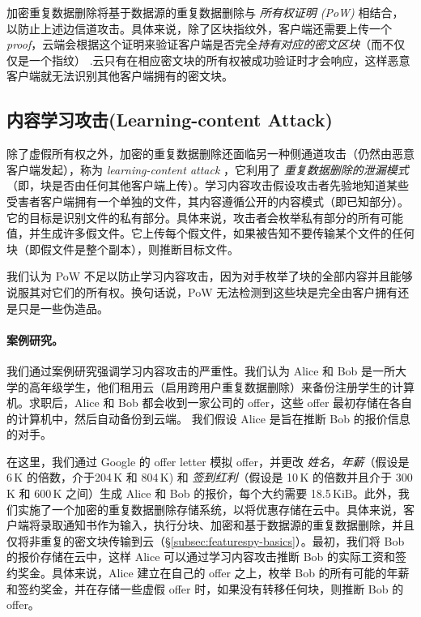 加密重复数据删除将基于数据源的重复数据删除与 {\em 所有权证明 (PoW)} \cite{halevi11} 相结合，以防止上述边信道攻击。具体来说，除了区块指纹外，客户端还需要上传一个{\em proof}，云端会根据这个证明来验证客户端是否完全{\em 持有对应的密文区块}（而不仅仅是一个指纹） .云只有在相应密文块的所有权被成功验证时才会响应，这样恶意客户端就无法识别其他客户端拥有的密文块。

\subsection{内容学习攻击(Learning-content Attack)}
\label{subsec:featurespy-attack}
除了虚假所有权之外，加密的重复数据删除还面临另一种侧通道攻击（仍然由恶意客户端发起），称为 {\em learning-content attack} \cite{harnik10, zuo18}，它利用了 {\em 重复数据删除的泄漏模式}（即，块是否由任何其他客户端上传）。学习内容攻击假设攻击者先验地知道某些受害者客户端拥有一个单独的文件，其内容遵循公开的内容模式（即已知部分）。它的目标是识别文件的私有部分。具体来说，攻击者会枚举私有部分的所有可能值，并生成许多假文件。它上传每个假文件，如果被告知不要传输某个文件的任何块（即假文件是整个副本），则推断目标文件。

我们认为 PoW \cite{halevi11} 不足以防止学习内容攻击，因为对手枚举了块的全部内容并且能够说服其对它们的所有权。换句话说，PoW 无法检测到这些块是完全由客户拥有还是只是一些伪造品。

\paragraph*{案例研究。}
我们通过案例研究强调学习内容攻击的严重性。我们认为 Alice 和 Bob 是一所大学的高年级学生，他们租用云（启用跨用户重复数据删除）来备份注册学生的计算机。求职后，Alice 和 Bob 都会收到一家公司的 offer，这些 offer 最初存储在各自的计算机中，然后自动备份到云端。
我们假设 Alice 是旨在推断 Bob 的报价信息的对手。


在这里，我们通过 Google 的 offer letter \cite{google_offer} 模拟 offer，并更改 \textit{姓名}，\textit{年薪}（假设是 6\,K \cite{harnik10} 的倍数，介于204\,K 和 804\,K) 和 \textit{签到红利}（假设是 10\,K 的倍数并且介于 300\,K 和 600\,K 之间）生成 Alice 和 Bob 的报价，每个大约需要 18.5\,KiB。此外，我们实施了一个加密的重复数据删除存储系统，以将优惠存储在云中。具体来说，客户端将录取通知书作为输入，执行分块、加密和基于数据源的重复数据删除，并且仅将非重复的密文块传输到云（\S\ref{subsec:featurespy-basics}）。最初，我们将 Bob 的报价存储在云中，这样 Alice 可以通过学习内容攻击推断 Bob 的实际工资和签约奖金。具体来说，Alice 建立在自己的 offer 之上，枚举 Bob 的所有可能的年薪和签约奖金，并在存储一些虚假 offer 时，如果没有转移任何块，则推断 Bob 的 offer。


